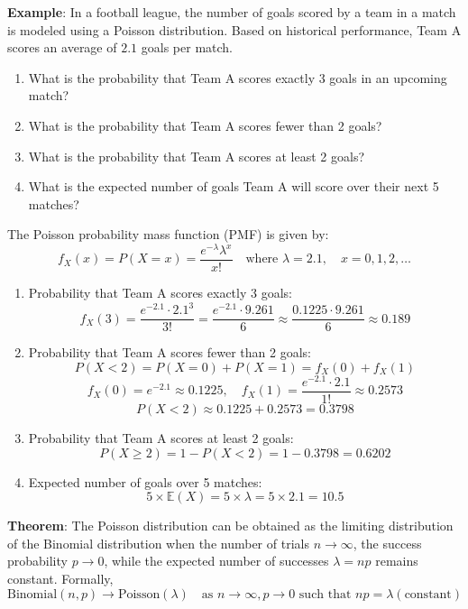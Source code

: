 \documentclass[twoside]{book}
\begin{document}
\textbf{Example}: In a football league, the number of goals scored by a team in a match is modeled using a Poisson distribution. Based on historical performance, Team A scores an average of $2.1$ goals per match.

\begin{enumerate}
    \item What is the probability that Team A scores exactly 3 goals in an upcoming match?
    \item What is the probability that Team A scores fewer than 2 goals?
    \item What is the probability that Team A scores at least 2 goals?
    \item What is the expected number of goals Team A will score over their next 5 matches?
\end{enumerate}

The Poisson probability mass function (PMF) is given by:
\[
f_X(x) = P(X=x)= \frac{e^{-\lambda} \lambda^x}{x!}
\quad \text{where } \lambda = 2.1, \quad x = 0, 1, 2, \dots
\]

\begin{enumerate}
    \item {Probability that Team A scores exactly 3 goals:}
    \[
    f_X(3)  = \frac{e^{-2.1} \cdot 2.1^3}{3!}
    = \frac{e^{-2.1} \cdot 9.261}{6}
    \approx \frac{0.1225 \cdot 9.261}{6}
    \approx 0.189
    \]

    \item {Probability that Team A scores fewer than 2 goals:}
    \[
    P(X < 2) = {P}(X = 0) + {P}(X = 1) = f_X(0) + f_X(1)
    \]
    \[
    f_X(0) = e^{-2.1} \approx 0.1225, \quad 
    f_X(1) = \frac{e^{-2.1} \cdot 2.1}{1!} \approx 0.2573
    \]
    \[
    P(X < 2) \approx 0.1225 + 0.2573 = 0.3798
    \]

    \item {Probability that Team A scores at least 2 goals:}
    \[
    P(X \geq 2) = 1 - P(X < 2) = 1 - 0.3798 = 0.6202
    \]

    \item {Expected number of goals over 5 matches:}
    \[
    5 \times \mathbb{E}(X) = 5 \times \lambda = 5 \times 2.1 = 10.5
    \]
\end{enumerate}

\begin{textbox}
\textbf{Theorem}: The Poisson distribution can be obtained as the limiting distribution of the Binomial distribution when the number of trials \( n \to \infty \), the success probability \( p \to 0\), while the expected number of successes \( \lambda = np \) remains constant. Formally,
\[
\text{Binomial}(n, p) \longrightarrow \text{Poisson}(\lambda) \quad \text{as } n \to \infty, p \to 0 \text{ such that } np = \lambda (\text{constant})
\]
\end{textbox}
\end{document}
